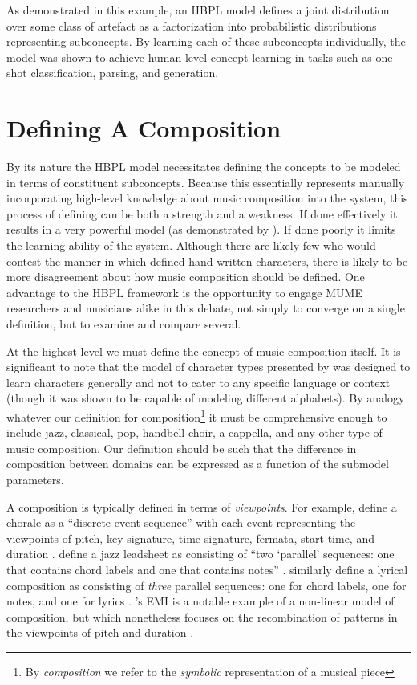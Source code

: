 \documentclass[letterpaper]{article}
\begin{document}
As demonstrated in this example, an HBPL model defines a joint distribution over some class of artefact as a factorization into probabilistic distributions representing subconcepts. By learning each of these subconcepts individually, the model was shown to achieve human-level concept learning in tasks such as one-shot classification, parsing, and generation.

\section{Defining A Composition}

By its nature the HBPL model necessitates defining the concepts to be modeled in terms of constituent subconcepts. Because this essentially represents manually incorporating high-level knowledge about music composition into the system, this process of defining can be both a strength and a weakness. If done effectively it results in a very powerful model (as demonstrated by \citeauthor{lake2015human} ). If done poorly it limits the learning ability of the system. Although there are likely few who would contest the manner in which \citeauthor{lake2015human} defined hand-written characters, there is likely to be more disagreement about how music composition should be defined. One advantage to the HBPL framework is the opportunity to engage MUME researchers and musicians alike in this debate, not simply to converge on a single definition, but to examine and compare several.

At the highest level we must define the concept of music composition itself.  It is significant to note that the model of character types presented by \citeauthor{lake2015human} was designed to learn characters generally and not to cater to any specific language or context (though it was shown to be capable of modeling different alphabets). By analogy whatever our definition for composition\footnote{By \emph{composition} we refer to the \emph{symbolic} representation of a musical piece} it must be comprehensive enough to include jazz, classical, pop, handbell choir, a cappella, and any other type of music composition. Our definition should be such that the difference in composition between domains can be expressed as a function of the submodel parameters.

A composition is typically defined in terms of \emph{viewpoints}. For example, \citeauthor{conklin1995multiple} define a chorale as a ``discrete event sequence'' with each event representing the viewpoints of pitch, key signature, time signature, fermata, start time, and duration . \citeauthor{pachet2014imitative} define a jazz leadsheet as consisting of ``two `parallel' sequences: one that contains chord labels and one that contains notes'' . \citeauthor{bodily2017ICCC} similarly define a lyrical composition as consisting of \emph{three} parallel sequences: one for chord labels, one for notes, and one for lyrics . \citeauthor{cope1989experiments}'s EMI is a notable example of a non-linear model of composition, but which nonetheless focuses on the recombination of patterns in the viewpoints of pitch and duration .
\end{document}
